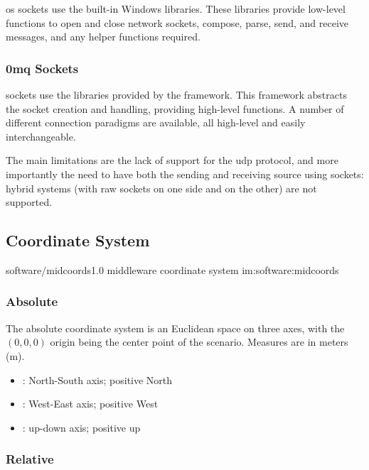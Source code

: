 \gls{os} sockets use the built-in Windows  libraries. These libraries provide low-level functions to open and close network sockets, compose, parse, send, and receive messages, and any helper functions required.

\subsubsection{0mq Sockets}

 sockets use the libraries provided by the  framework. This framework abstracts the socket creation and handling, providing high-level functions. A number of different connection paradigms are available, all high-level and easily interchangeable.

The main limitations are the lack of support for the \gls{udp} protocol, and more importantly the need to have both the sending and receiving source using  sockets: hybrid systems (with raw sockets on one side and  on the other) are not supported.

\subsection{Coordinate System}

\begin{image}
	{software/midcoords}{1.0}
	{\gls{middleware} coordinate system}
	{im:software:midcoords}
	{}
\end{image}

\subsubsection{Absolute}

The absolute coordinate system is an Euclidean space on three axes, with the $(0,0,0)$ origin being the center point of the scenario. Measures are in meters (\si{\meter}).

\begin{itemize}
	\item {}: North-South axis; positive North
	\item {}: West-East axis; positive West
	\item {}: up-down axis; positive up
\end{itemize}

\subsubsection{Relative}

